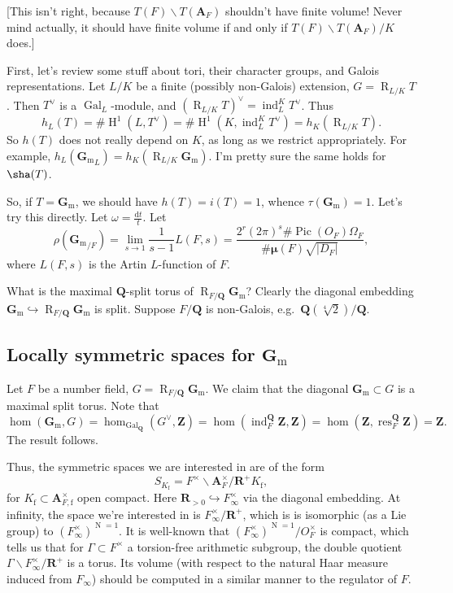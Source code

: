\documentclass{article}
\DeclareMathOperator{\galois}{Gal}
\DeclareMathOperator{\h}{H}
\DeclareMathOperator{\induce}{ind}
\DeclareMathOperator{\norm}{N}
\DeclareMathOperator{\picard}{Pic}
\DeclareMathOperator{\restrict}{res}
\DeclareMathOperator{\weil}{R}
\newcommand{\bA}{\mathbf{A}}
\newcommand{\bmu}{{\bm\mu}}
\newcommand{\bQ}{\mathbf{Q}}
\newcommand{\bR}{\mathbf{R}}
\newcommand{\bZ}{\mathbf{Z}}
\newcommand{\dd}{\mathrm{d}}
\newcommand{\finite}{\mathrm{f}}
\newcommand{\Gm}{\mathbf{G}_\mathrm{m}}
\begin{document}
[This isn't right, because $T(F)\backslash T(\bA_F)$ shouldn't have finite 
volume! Never mind actually, it should have finite volume if and only if 
$T(F)\backslash T(\bA_F)/K$ does.]

First, let's review some stuff about tori, their character groups, and Galois 
representations. Let $L/K$ be a finite (possibly non-Galois) extension, 
$G=\weil_{L/K} T$. Then $T^\vee$ is a $\galois_L$-module, and 
$(\weil_{L/K} T)^\vee = \induce_L^K T^\vee$. Thus 
\[
  h_L(T) = \# \h^1(L,T^\vee) = \# \h^1(K,\induce_L^K T^\vee) = h_K(\weil_{L/K} T) .
\]
So $h(T)$ does not really depend on $K$, as long as we restrict appropriately. 
For example, $h_L({\Gm}_L) = h_K(\weil_{L/K} \Gm)$. I'm pretty sure the same 
holds for $\sha(T)$. 

So, if $T=\Gm$, we should have $h(T)=i(T)=1$, whence $\tau(\Gm)=1$. Let's try 
this directly. Let $\omega=\frac{\dd t}{t}$. Let 
\[
  \rho({\Gm}_{/F}) = \lim_{s\to 1} \frac{1}{s-1} L(F,s) = \frac{2^r (2\pi)^s \# \picard(O_F) \Omega_F}{\# \bmu(F) \sqrt{|D_F|}},
\]
where $L(F,s)$ is the Artin $L$-function of $F$. 

What is the maximal $\bQ$-split torus of $\weil_{F/\bQ} \Gm$? Clearly the 
diagonal embedding $\Gm\hookrightarrow \weil_{F/\bQ} \Gm$ is split. Suppose 
$F/\bQ$ is non-Galois, e.g.~$\bQ(\sqrt[4]{2})/\bQ$. 





\subsection{Locally symmetric spaces for $\Gm$}

Let $F$ be a number field, $G=\weil_{F/\bQ} \Gm$. We claim that the diagonal 
$\Gm\subset G$ is a maximal split torus. Note that 
\[
  \hom(\Gm,G) = \hom_{\galois_\bQ}(G^\vee,\bZ) = \hom(\induce_F^\bQ \bZ,\bZ) = \hom(\bZ,\restrict_F^\bQ \bZ) = \bZ .
\]
The result follows. 

Thus, the symmetric spaces we are interested in are of the form 
\[
  S_{K_\finite} = F^\times \backslash \bA_F^\times / \bR^+ K_\finite ,
\]
for $K_\finite\subset \bA_{F,\finite}^\times$ open compact. Here 
$\bR_{>0}\hookrightarrow F_\infty^\times$ via the diagonal embedding. At 
infinity, the space we're interested in is $F_\infty^\times/\bR^+$, which is 
is isomorphic (as a Lie group) to $(F_\infty^\times)^{\norm=1}$. It is 
well-known that $(F_\infty^\times)^{\norm=1}/O_F^\times$ is compact, which 
tells us that for $\Gamma\subset F^\times$ a torsion-free arithmetic subgroup, 
the double quotient $\Gamma\backslash F_\infty^\times / \bR^+$ is a torus. Its 
volume (with respect to the natural Haar measure induced from $F_\infty$) 
should be computed in a similar manner to the regulator of $F$. 
\end{document}
